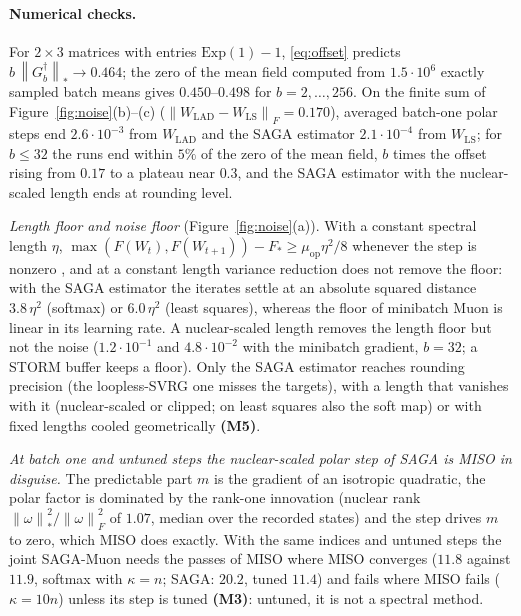 \documentclass[10pt]{article}
\theoremstyle{remark}
\newcommand{\nnuc}[1]{\left\|#1\right\|_{*}}
\newcommand{\nF}[1]{\left\|#1\right\|_{F}}
\newcommand{\muop}{\mu_{\mathrm{op}}}
\newcommand{\finding}[1]{\textbf{(#1)}}
\begin{document}
\paragraph{Numerical checks.} For $2\times3$ matrices with entries $\mathrm{Exp}(1)-1$, \eqref{eq:offset} predicts
$b\,\nnuc{G_b^\dagger}\to0.464$; the zero of the mean field computed from $1.5\cdot10^6$ exactly sampled batch means gives
$0.450$--$0.498$ for $b=2,\dots,256$. On the finite sum of Figure~\ref{fig:noise}(b)--(c)
($\nF{W_{\mathrm{LAD}}-W_{\mathrm{LS}}}=0.170$), averaged batch-one polar steps end $2.6\cdot10^{-3}$ from $W_{\mathrm{LAD}}$ and
the SAGA estimator $2.1\cdot10^{-4}$ from $W_{\mathrm{LS}}$; for $b\le32$ the runs end within $5\%$ of the zero of the mean
field, $b$ times the offset rising from $0.17$ to a plateau near $0.3$, and the SAGA estimator with the nuclear-scaled
length ends at rounding level.

\begin{description}[leftmargin=2.3em,labelwidth=2.0em,labelsep=0.3em,itemsep=1pt,topsep=3pt,parsep=0pt,font=\normalfont\bfseries]
\item[(M1)] \emph{Length floor and noise floor} (Figure~\ref{fig:noise}(a)). With a constant spectral length $\eta$,
$\max(F(W_t),F(W_{t+1}))-F_\ast\ge\muop\eta^2/8$ whenever the step is nonzero \cite[Lemma~4]{jawanpuria2026constant}, and
at a constant length variance reduction does not remove the floor: with the SAGA estimator the iterates settle at an absolute
squared distance $3.8\,\eta^2$ (softmax) or $6.0\,\eta^2$ (least squares), whereas the floor of minibatch Muon is linear in
its learning rate. A nuclear-scaled length removes the length floor but not the noise ($1.2\cdot10^{-1}$ and
$4.8\cdot10^{-2}$ with the minibatch gradient, $b=32$; a STORM buffer \cite{cutkosky2019momentum} keeps a floor).
Only the SAGA estimator reaches rounding precision (the loopless-SVRG one misses the targets), with a length that vanishes with it (nuclear-scaled or clipped;
on least squares also the soft map) or with fixed lengths cooled geometrically \finding{M5}.
\item[(M2)] \emph{At batch one and untuned steps the nuclear-scaled polar step of SAGA is MISO in disguise.} The predictable part $m$ is the
gradient of an isotropic quadratic, the polar factor is dominated by the rank-one innovation (nuclear rank
$\nnuc\omega^2/\nF\omega^2$ of $1.07$, median over the recorded states) and the step drives $m$ to zero, which MISO does
exactly. With the same indices and untuned steps the joint SAGA-Muon needs the passes of MISO where MISO converges ($11.8$ against $11.9$,
softmax with $\kappa=n$; SAGA: $20.2$, tuned $11.4$) and fails where MISO fails ($\kappa=10n$) unless its step is tuned \finding{M3}: untuned, it is not a spectral method.
\end{description}
\end{document}
